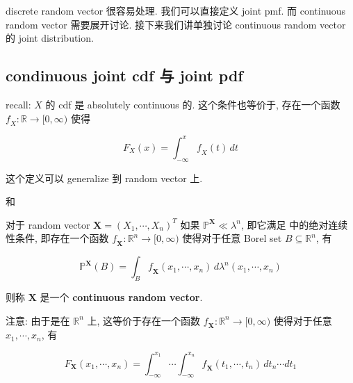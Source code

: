 discrete random vector 很容易处理. 我们可以直接定义 joint pmf. 而 continuous random vector 需要展开讨论. 接下来我们讲单独讨论 continuous random vector 的 joint distribution.

\subsection{condinuous joint cdf 与 joint pdf}\label{condinuous-joint-cdf-ux4e0e-joint-pdf}

recall:  \(\mathit{X}\) 的 cdf 是 absolutely continuous 的. 这个条件也等价于, 存在一个函数 \(\mathit{f}_{\mathit{X}}:\mathbb{R}\rightarrow\lbrack 0,\infty)\) 使得

\[\mathit{F}_{\mathit{X}}(\mathit{x}) = \int_{- \infty}^{\mathit{x}}\mathit{f}_{\mathit{X}}(\mathit{t})\,\mathit{d}\mathit{t}\]

这个定义可以 generalize 到 random vector 上.

\begin{definition}{ 和 }

对于 random vector \(\mathbf{X} = (\mathit{X}_{1},\cdots,\mathit{X}_{\mathit{n}})^{\mathit{T}}\) 如果 \(\mathbb{P}^{\mathbf{X}} \ll \mathit{\lambda}^{\mathit{n}}\), 即它满足  中的绝对连续性条件, 即存在一个函数 \(\mathit{f}_{\mathbf{X}}:\mathbb{R}^{\mathit{n}}\rightarrow\lbrack 0,\infty)\) 使得对于任意 Borel set \(\mathit{B} \subseteq \mathbb{R}^{\mathit{n}}\), 有

\[\mathbb{P}^{\mathbf{X}}(\mathit{B}) = \int_{\mathit{B}}\mathit{f}_{\mathbf{X}}(\mathit{x}_{1},\cdots,\mathit{x}_{\mathit{n}})\,\mathit{d}\mathit{\lambda}^{\mathit{n}}(\mathit{x}_{1},\cdots,\mathit{x}_{\mathit{n}})\]

则称 \(\mathbf{X}\) 是一个 \textbf{continuous random vector}.

注意: 由于是在 \(\mathbb{R}^{\mathit{n}}\) 上, 这等价于存在一个函数 \(\mathit{f}_{\mathbf{X}}:\mathbb{R}^{\mathit{n}}\rightarrow\lbrack 0,\infty)\) 使得对于任意 \(\mathit{x}_{1},\cdots,\mathit{x}_{\mathit{n}}\), 有

\[\mathit{F}_{\mathbf{X}}(\mathit{x}_{1},\cdots,\mathit{x}_{\mathit{n}}) = \int_{- \infty}^{\mathit{x}_{1}}\cdots\int_{- \infty}^{\mathit{x}_{\mathit{n}}}\mathit{f}_{\mathbf{X}}(\mathit{t}_{1},\cdots,\mathit{t}_{\mathit{n}})\,\mathit{d}\mathit{t}_{\mathit{n}}\cdots\mathit{d}\mathit{t}_{1}\]

\end{definition}

